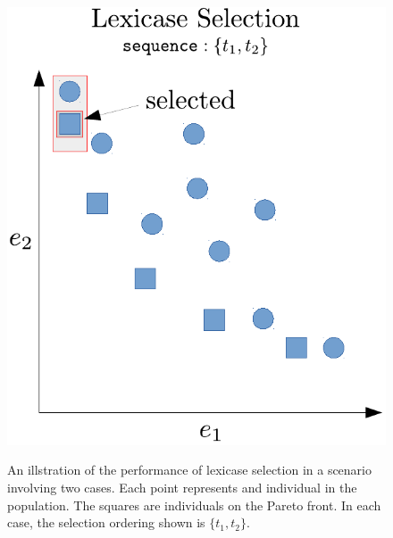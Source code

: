 \documentclass[preprint]{article}
\begin{document}
\begin{figure}

\begin{minipage}{0.49\textwidth}
\centering
  \includegraphics[width = \textwidth]{figs/lex_pareto.pdf}\label{fig:lex_pareto}
  \caption{An illstration of the performance of lexicase selection in a scenario involving two cases. Each point represents and individual in the population. The squares are individuals on the Pareto front. In each case, the selection ordering shown is $\{t_1,t_2\}$. }
\end{minipage}
\begin{minipage}{0.49\textwidth}
\centering

\end{minipage}
\end{figure}
\end{document}
